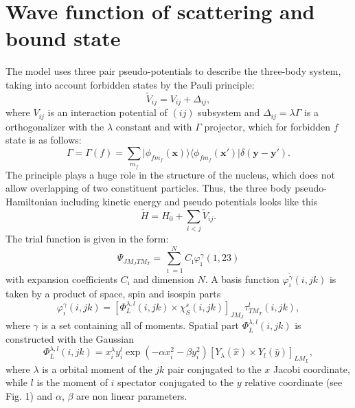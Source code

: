 \documentclass[
12pt, %
oneside, %
english, %
onehalfspacing, %
headsepline, %
]{MastersDoctoralThesis} %
\begin{document}
\section{Wave function of scattering and bound state}

The model \cite{Kukulin1977} uses three pair pseudo-potentials to describe the three-body system, taking into account forbidden states by the Pauli principle:
\begin{equation}
\label{pseudopot}
\widetilde{V}_{ij}=V_{ij}+\Delta_{ij},
\end{equation}
where $V_{ij}$ is  an interaction potential of $(ij)$ subsystem and $\Delta_{ij}=\lambda \Gamma$ is a orthogonalizer with the $\lambda$ constant and with $\Gamma$ projector, which  for  forbidden $f$ state is as follows:
\begin{equation}
\label{projector}
\Gamma=\Gamma(f)=\sum\limits_{m_f}\vert \phi_{fm_f} ({\mathbf x})\rangle \langle  \phi_{fm_f} ({\mathbf x'}) \vert \delta({\mathbf y - \mathbf y'}).
\end{equation}
The principle plays a huge role in the structure of the nucleus, which does not allow overlapping of two constituent particles. Thus, the three body pseudo-Hamiltonian including kinetic energy and pseudo potentials looks like this
\begin{equation}
\label{pseudohamiltonian}
\widetilde{H}=H_0+\sum_{i < j} \widetilde{V }_{ij}.
\end{equation}
The trial function is given in the form:
\begin{equation}
\Psi_{JM_J TM_T}=\sum_{\imath=1}^N C_{\imath} \varphi_{\imath}^{{\gamma}}(1,23)
\end{equation}
with expansion coefficients $C_{\imath}$ and  dimension $N$. A basis function $\varphi_{\imath}^{\widetilde{\gamma}}(i,jk)$ is taken by a product of space, spin and isospin parts
\begin{equation}
\label{basisfunction}
\varphi_{\imath}^{{\gamma}}(i,jk)=[   \Phi^{\lambda,l}_L(i,jk) \times \chi_S^s(i,jk)   ]_{JM_J} \tau^t_{TM_T}(i,jk),
\end{equation}
where ${{\gamma}}$ is a set containing all of moments. Spatial part $\Phi^{\lambda,l}_L(i,jk)$  is constructed with the Gaussian
\begin{equation}
\Phi^{\lambda,l}_L(i,jk)=x^{\lambda}_iy^{l}_i \exp(-\alpha x^2_i-\beta y^2_i)[Y_\lambda(\widehat{x}) \times Y_l(\widehat{y})]_{LM_L},
\end{equation} 
where $\lambda$ is a orbital moment of the $jk$ pair   conjugated to the $x$ Jacobi coordinate, while $l$ is the moment of  $i$ spectator conjugated to the $y$ relative coordinate (see Fig. 1) and $\alpha$, $\beta$ are non linear parameters.
\end{document}
